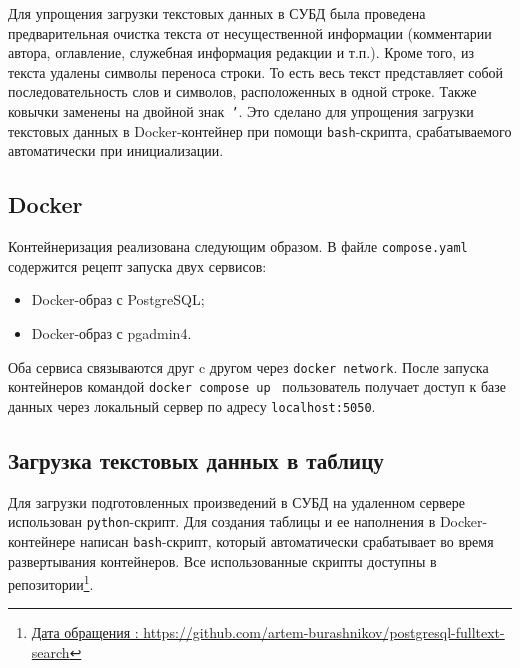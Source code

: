 Для упрощения загрузки текстовых данных в СУБД была проведена предварительная очистка текста от несущественной информации (комментарии автора, оглавление, служебная информация редакции и т.п.).
Кроме того, из текста удалены символы переноса строки.
То есть весь текст представляет собой последовательность слов и символов, расположенных в одной строке.
Также ковычки заменены на двойной знак~\texttt{'}.
Это сделано для упрощения загрузки текстовых данных в Docker-контейнер при помощи \texttt{bash}-скрипта, срабатываемого автоматически при инициализации.

\subsection{Docker}

Контейнеризация реализована следующим образом.
В файле \texttt{compose.yaml} содержится рецепт запуска двух сервисов:
\begin{itemize}
    \item Docker-образ с PostgreSQL;
    \item Docker-образ с pgadmin4.
\end{itemize}

\noindent Оба сервиса связываются друг c другом через \texttt{docker network}.
После запуска контейнеров командой \texttt{docker compose up}~\cite{DockerComposeDocs} пользователь получает доступ к базе данных через локальный сервер по адресу \texttt{localhost:5050}.

\subsection{Загрузка текстовых данных в таблицу}

Для загрузки подготовленных произведений в СУБД на удаленном сервере использован \texttt{python}-скрипт.
Для создания таблицы и ее наполнения в Docker-контейнере написан \texttt{bash}-скрипт, который автоматически срабатывает во время развертывания контейнеров.
Все использованные скрипты доступны в репозитории\footnote{\href{https://github.com/artem-burashnikov/postgresql-fulltext-search}{Дата обращения : https://github.com/artem-burashnikov/postgresql-fulltext-search}}.


